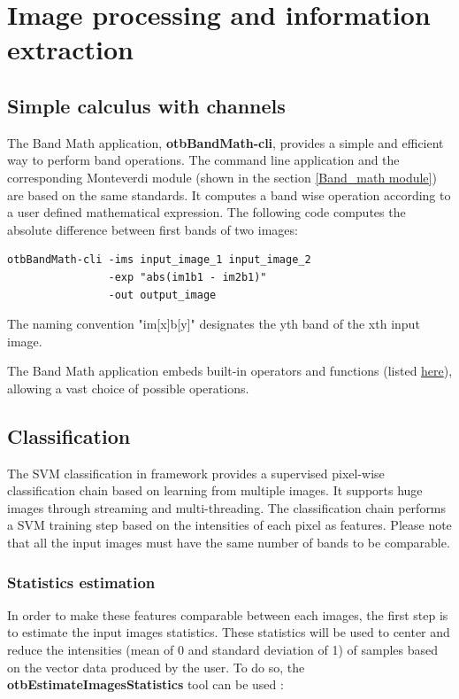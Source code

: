\section{Image processing and information extraction}\label{sec:improc}

\subsection{Simple calculus with channels}\label{ssec:calculus}

The Band Math application, \textbf{otbBandMath-cli}, provides a simple and efficient way to perform band operations. The command line application and the corresponding Monteverdi module (shown in the section \ref{Band_math module}) are based on the same standards. It computes a band wise operation according to a user defined mathematical expression. The following code computes the absolute difference between first bands of two images:

\begin{verbatim}
otbBandMath-cli -ims input_image_1 input_image_2 
                -exp "abs(im1b1 - im2b1)"
                -out output_image
\end{verbatim}

The naming convention "im[x]b[y]" designates the yth band of the xth input image.

The Band Math application embeds built-in operators and functions (listed \href{http://muparser.sourceforge.net/mup_features.html#idDef2}{here}), allowing a vast choice of possible operations. 

\subsection{Classification}\label{ssec:classification}

The SVM classification in \app framework provides a supervised pixel-wise classification chain based on learning from multiple images. It supports huge images through streaming and multi-threading.
The classification chain performs a SVM training step based on the intensities of each pixel as features. Please note that all the input images must have the same number of bands to be comparable.

\subsubsection{Statistics estimation}
In order to make these features comparable between each images, the first step is to estimate the input images statistics. These statistics will be used to center and reduce the intensities (mean of 0 and standard deviation of 1) of samples based on the vector data produced by the user. To do so, the \textbf{otbEstimateImagesStatistics} tool can be used :

